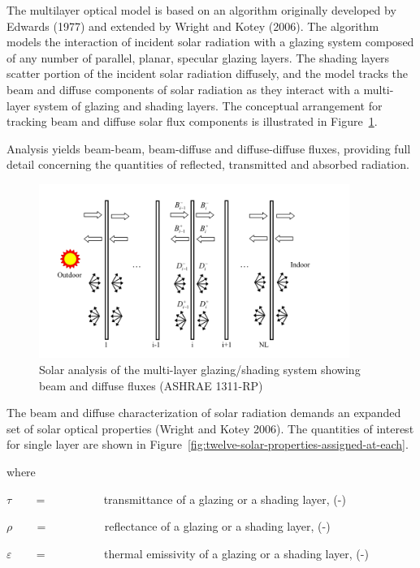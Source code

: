 The multilayer optical model is based on an algorithm originally developed by Edwards (1977) and extended by Wright and Kotey (2006). The algorithm models the interaction of incident solar radiation with a glazing system composed of any number of parallel, planar, specular glazing layers. The shading layers scatter portion of the incident solar radiation diffusely, and the model tracks the beam and diffuse components of solar radiation as they interact with a multi-layer system of glazing and shading layers. The conceptual arrangement for tracking beam and diffuse solar flux components is illustrated in Figure~\ref{fig:solar-analysis-of-the-multi-layer}.

Analysis yields beam-beam, beam-diffuse and diffuse-diffuse fluxes, providing full detail concerning the quantities of reflected, transmitted and absorbed radiation.

\begin{figure}[hbtp] %
\centering
\includegraphics[width=0.9\textwidth, height=0.9\textheight, keepaspectratio=true]{media/image1829.svg.png}
\caption{Solar analysis of the multi-layer glazing/shading system showing beam and diffuse fluxes (ASHRAE 1311-RP) \protect \label{fig:solar-analysis-of-the-multi-layer}}
\end{figure}

The beam and diffuse characterization of solar radiation demands an expanded set of solar optical properties (Wright and Kotey 2006). The quantities of interest for single layer are shown in Figure~\ref{fig:twelve-solar-properties-assigned-at-each}.

where

$\tau$ ~~~ = ~~~~~~~~~ transmittance of a glazing or a shading layer, (-)

$\rho$ ~~~ = ~~~~~~~~~ reflectance of a glazing or a shading layer, (-)

$\varepsilon$ ~~~ = ~~~~~~~~~ thermal emissivity of a glazing or a shading layer, (-)


